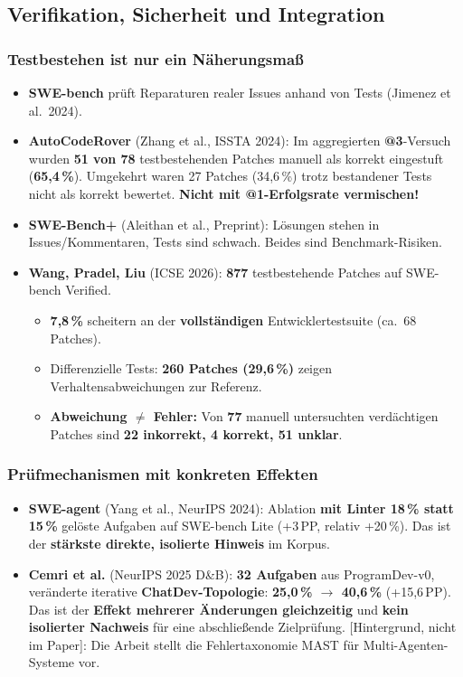 \documentclass[12pt,a4paper]{article}
\newcommand{\hg}{\textcolor{grau}{\small[Hintergrund, nicht im Paper]}}
\newcommand{\quelle}[1]{\textcolor{grau}{(#1)}}
\newcommand{\pp}{\,PP}
\begin{document}
\subsection{Verifikation, Sicherheit und Integration}

\subsubsection*{Testbestehen ist nur ein Näherungsmaß}
\begin{itemize}
  \item \textbf{SWE-bench} prüft Reparaturen realer Issues anhand von Tests \quelle{Jimenez et al.\ 2024}.
  \item \textbf{AutoCodeRover} \quelle{Zhang et al., ISSTA 2024}: Im aggregierten \textbf{@3}-Versuch wurden \textbf{51 von 78} testbestehenden Patches manuell als korrekt eingestuft (\textbf{65,4\,\%}). Umgekehrt waren 27 Patches (34,6\,\%) trotz bestandener Tests nicht als korrekt bewertet. \textbf{Nicht mit @1-Erfolgsrate vermischen!}
  \item \textbf{SWE-Bench+} \quelle{Aleithan et al., Preprint}: Lösungen stehen in Issues/Kommentaren, Tests sind schwach. Beides sind Benchmark-Risiken.
  \item \textbf{Wang, Pradel, Liu} \quelle{ICSE 2026}: \textbf{877} testbestehende Patches auf SWE-bench Verified.
  \begin{itemize}
    \item \textbf{7,8\,\%} scheitern an der \textbf{vollständigen} Entwicklertestsuite (ca.\ 68 Patches).
    \item Differenzielle Tests: \textbf{260 Patches (29,6\,\%)} zeigen Verhaltensabweichungen zur Referenz.
    \item \textbf{Abweichung $\neq$ Fehler:} Von \textbf{77} manuell untersuchten verdächtigen Patches sind \textbf{22 inkorrekt, 4 korrekt, 51 unklar}.
  \end{itemize}
\end{itemize}

\subsubsection*{Prüfmechanismen mit konkreten Effekten}
\begin{itemize}
  \item \textbf{SWE-agent} \quelle{Yang et al., NeurIPS 2024}: Ablation \textbf{mit Linter 18\,\% statt 15\,\%} gelöste Aufgaben auf SWE-bench Lite (+3\pp, relativ +20\,\%). Das ist der \textbf{stärkste direkte, isolierte Hinweis} im Korpus.
  \item \textbf{Cemri et al.} \quelle{NeurIPS 2025 D\&B}: \textbf{32 Aufgaben} aus ProgramDev-v0, veränderte iterative \textbf{ChatDev-Topologie}: \textbf{25,0\,\% $\to$ 40,6\,\%} (+15,6\pp). Das ist der \textbf{Effekt mehrerer Änderungen gleichzeitig} und \textbf{kein isolierter Nachweis} für eine abschließende Zielprüfung. \hg: Die Arbeit stellt die Fehlertaxonomie MAST für Multi-Agenten-Systeme vor.
\end{itemize}
\end{document}
